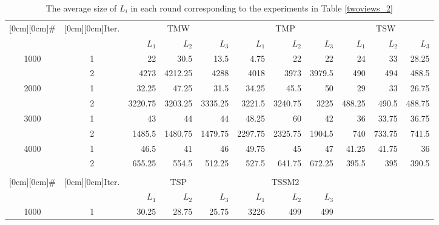 \documentclass[english]{jnlp_1.4}
\begin{document}
\begin{table}[t]
\centering \caption{The average size of $L_{i}$ in each round
corresponding to the experiments in Table \ref{twoviews_2}}
\label{tab:sizeLi_2}
\begin{tabular}{|c|c|r|r|r|r|r|r|r|r|r|}
\hline
 \raisebox{-1.50ex}[0cm][0cm]{\#} & \raisebox{-1.50ex}[0cm][0cm]{Iter.} & \multicolumn{3}{|c|}{TMW} & \multicolumn{3}{|c|}{TMP} & \multicolumn{3}{|c|}{TSW} \\
\cline{3-11} & &  $L_{1}$ & $L_{2}$ & $L_{3}$ & $L_{1}$ &  $L_{2}$ & $L_{3}$ & $L_{1}$ & $L_{2}$ &  $L_{3}$  \\
  \hline
\multirow{2}{*}{1000} &   1 &         22 &       30.5 &       13.5 &       4.75 &         22 &         22 &         24 &         33 &      28.25 \\
 &          2 &       4273 &    4212.25 &       4288 &       4018 &       3973 &     3979.5 &        490 &        494 &      488.5 \\
  \hline
\multirow{2}{*}{2000} &   1 &      32.25 &      47.25 &       31.5 &      34.25 &       45.5 &         50 &         29 &         33 &      26.75 \\
 &          2 &    3220.75 &    3203.25 &    3335.25 &     3221.5 &    3240.75 &       3225 &     488.25 &      490.5 &     488.75 \\
  \hline
\multirow{ 2}{*}{3000} &          1 &         43 &         44 &         44 &      48.25 &         60 &         42 &         36 &      33.75 &      36.75 \\
     &     2 &     1485.5 &    1480.75 &    1479.75 &    2297.75 &    2325.75 &     1904.5 &        740 &     733.75 &      741.5 \\
\hline
\multirow{ 2}{*}{4000} &          1 &       46.5 &         41 &         46 &      49.75 &         45 &         47 &      41.25 &      41.75 &         36 \\
 &          2 &     655.25 &      554.5 &     512.25 &      527.5 &     641.75 &     672.25 &      395.5 &        395 &      390.5 \\
\hline
\multicolumn{11}{c}{} \\
\cline{1-8}
 \raisebox{-1.50ex}[0cm][0cm]{\#} & \raisebox{-1.50ex}[0cm][0cm]{Iter.} & \multicolumn{3}{|c|}{TSP} & \multicolumn{3}{|c|}{TSSM2} & \multicolumn{3}{|c}{} \\
\cline{3-8} & &  $L_{1}$ & $L_{2}$ & $L_{3}$ & $L_{1}$ &  $L_{2}$ & $L_{3}$ &  \multicolumn{3}{|c}{}   \\
\cline{1-8}
\multirow{2}{*}{1000} &          1 &      30.25 & 28.75 & 25.75 &       3226 &        499 &        499 & \multicolumn{ 3}{|c}{} \\

\end{tabular}
\end{table}
\end{document}
